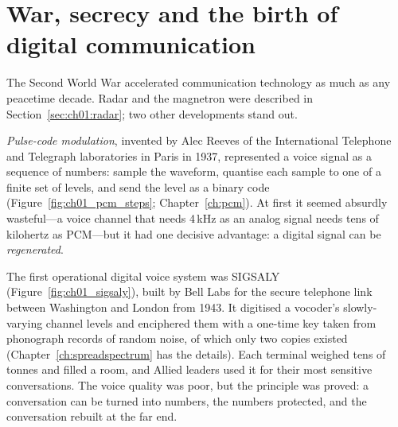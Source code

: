 \section{War, secrecy and the birth of digital communication}
\label{sec:ch01:digital}

The Second World War accelerated communication technology as much as any peacetime decade. Radar and
the magnetron were described in Section~\ref{sec:ch01:radar}; two other developments stand out.

\emph{Pulse-code modulation}, invented by Alec Reeves of the International Telephone and Telegraph
laboratories in Paris in 1937, represented a voice signal as a sequence of numbers: sample the waveform,
quantise each sample to one of a finite set of levels, and send the level as a binary code
(Figure~\ref{fig:ch01_pcm_steps}; Chapter~\ref{ch:pcm}). At first it seemed absurdly wasteful---a voice
channel that needs 4\,kHz as an analog signal needs tens of kilohertz as PCM---but it had one decisive
advantage: a digital signal can be \emph{regenerated}.



The first operational digital voice system was SIGSALY (Figure~\ref{fig:ch01_sigsaly}), built by Bell
Labs for the secure telephone link between Washington and London from 1943. It digitised a vocoder's
slowly-varying channel levels and enciphered them with a one-time key taken from phonograph records of
random noise, of which only two copies existed (Chapter~\ref{ch:spreadspectrum} has the details). Each
terminal weighed tens of tonnes and filled a room, and Allied leaders used it for their most sensitive
conversations. The voice quality was poor, but the principle
was proved: a conversation can be turned into numbers, the numbers protected, and the conversation
rebuilt at the far end.

